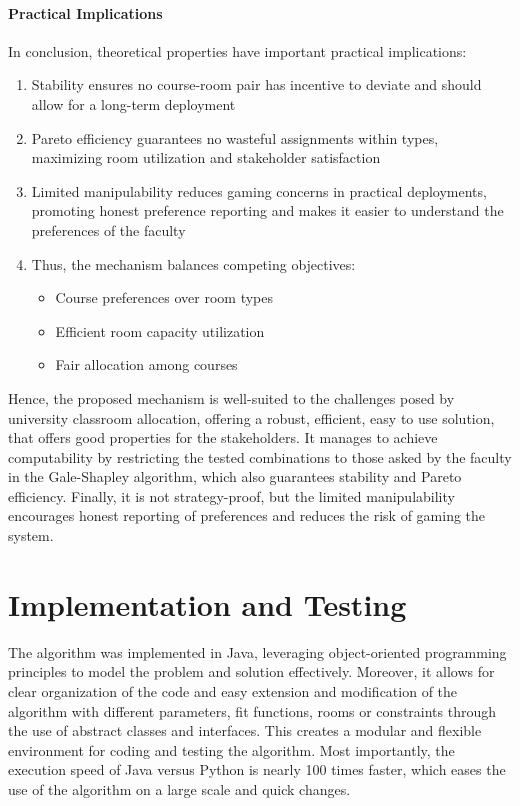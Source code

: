 \documentclass[a4paper, oneside]{article}
\theoremstyle{plain}
\begin{document}
\paragraph{Practical Implications}

In conclusion, theoretical properties have important practical implications:

\begin{enumerate}
	\item Stability ensures no course-room pair has incentive to deviate and should allow for a long-term deployment
	\item Pareto efficiency guarantees no wasteful assignments within types, maximizing room utilization and stakeholder satisfaction
	\item Limited manipulability reduces gaming concerns in practical deployments, promoting honest preference reporting and makes it easier to understand the preferences of the faculty
	\item Thus, the mechanism balances competing objectives:
	      \begin{itemize}
		      \item Course preferences over room types
		      \item Efficient room capacity utilization
		      \item Fair allocation among courses
	      \end{itemize}
\end{enumerate}

Hence, the proposed mechanism is well-suited to the challenges posed by university classroom allocation, offering a robust, efficient, easy to use solution,
that offers good properties for the stakeholders. It manages to achieve computability by restricting the tested combinations to those asked by the faculty
in the Gale-Shapley algorithm, which also guarantees stability and Pareto efficiency. Finally, it is not strategy-proof, but the limited manipulability
encourages honest reporting of preferences and reduces the risk of gaming the system.

\section{Implementation and Testing}

The algorithm was implemented in Java, leveraging object-oriented programming principles to model the problem and solution effectively.
Moreover, it allows for clear organization of the code and easy extension and modification of the algorithm with different parameters, fit functions,
rooms or constraints through the use of abstract classes and interfaces. This creates a modular and flexible environment for coding and testing the algorithm.
Most importantly, the execution speed of Java versus Python is nearly 100 times faster, which eases the use of the algorithm on a large scale and quick changes.
\end{document}
